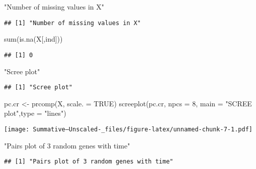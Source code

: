 \documentclass[
]{article}
\newenvironment{Shaded}{\begin{snugshade}}{\end{snugshade}}
\newcommand{\AttributeTok}[1]{\textcolor[rgb]{0.77,0.63,0.00}{#1}}
\newcommand{\ConstantTok}[1]{\textcolor[rgb]{0.00,0.00,0.00}{#1}}
\newcommand{\DecValTok}[1]{\textcolor[rgb]{0.00,0.00,0.81}{#1}}
\newcommand{\FunctionTok}[1]{\textcolor[rgb]{0.00,0.00,0.00}{#1}}
\newcommand{\NormalTok}[1]{#1}
\newcommand{\OtherTok}[1]{\textcolor[rgb]{0.56,0.35,0.01}{#1}}
\newcommand{\StringTok}[1]{\textcolor[rgb]{0.31,0.60,0.02}{#1}}
\begin{document}
\begin{Shaded}
\begin{Highlighting}[]
\StringTok{"Number of missing values in X"}
\end{Highlighting}
\end{Shaded}

\begin{verbatim}
## [1] "Number of missing values in X"
\end{verbatim}

\begin{Shaded}
\begin{Highlighting}[]
\FunctionTok{sum}\NormalTok{(}\FunctionTok{is.na}\NormalTok{(X[,ind]))}
\end{Highlighting}
\end{Shaded}

\begin{verbatim}
## [1] 0
\end{verbatim}

\begin{Shaded}
\begin{Highlighting}[]
\StringTok{"Scree plot"}
\end{Highlighting}
\end{Shaded}

\begin{verbatim}
## [1] "Scree plot"
\end{verbatim}

\begin{Shaded}
\begin{Highlighting}[]
\NormalTok{pc.cr }\OtherTok{\textless{}{-}} \FunctionTok{prcomp}\NormalTok{(X, }\AttributeTok{scale. =} \ConstantTok{TRUE}\NormalTok{)}
\FunctionTok{screeplot}\NormalTok{(pc.cr, }\AttributeTok{npcs =} \DecValTok{8}\NormalTok{, }\AttributeTok{main =} \StringTok{"SCREE plot"}\NormalTok{,}\AttributeTok{type =} \StringTok{"lines"}\NormalTok{)}
\end{Highlighting}
\end{Shaded}

\texttt{[image: Summative--Unscaled-\_files/figure-latex/unnamed-chunk-7-1.pdf]}

\begin{Shaded}
\begin{Highlighting}[]
\StringTok{"Pairs plot of 3 random genes with time"}
\end{Highlighting}
\end{Shaded}

\begin{verbatim}
## [1] "Pairs plot of 3 random genes with time"
\end{verbatim}
\end{document}
